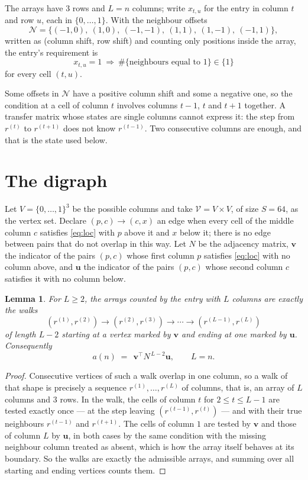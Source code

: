 \documentclass[11pt,a4paper]{article}
\theoremstyle{plain}
\newtheorem{lemma}[theorem]{Lemma}
\theoremstyle{definition}
\begin{document}
The arrays have $3$ rows and $L=n$ columns; write $x_{t,u}$ for the entry in
column $t$ and row $u$, each in $\{0,\dots,1\}$. With the neighbour offsets
\[
\mathcal N=\{(-1,0),\ (1,0),\ (-1,-1),\ (1,1),\ (1,-1),\ (-1,1)\},
\]
written as (column shift, row shift) and counting only positions inside the array, the
entry's requirement is
\begin{equation}\label{eq:loc}
x_{t,u}=1\ \Rightarrow\ \#\{\text{neighbours equal to }1\}\in\{1\}
\end{equation}
for every cell $(t,u)$.

Some offsets in $\mathcal N$ have a positive column shift and some a negative one, so the
condition at a cell of column $t$ involves columns $t-1$, $t$ and $t+1$ together. A transfer
matrix whose states are single columns cannot express it: the step from $r^{(t)}$ to
$r^{(t+1)}$ does not know $r^{(t-1)}$. Two consecutive columns are enough, and that is
the state used below.

\section{The digraph}

Let $V=\{0,\dots,1\}^{3}$ be the possible columns and take
$\mathcal V=V\times V$, of size $S=64$, as the vertex set. Declare $(p,c)\to(c,x)$ an edge
when every cell of the middle column $c$ satisfies \eqref{eq:loc} with $p$ above it and $x$
below it; there is no edge between pairs that do not overlap in this way. Let $N$ be the
adjacency matrix, $\mathbf{v}$ the indicator of the pairs $(p,c)$ whose first column $p$
satisfies \eqref{eq:loc} with no column above, and $\mathbf{u}$ the indicator of
the pairs $(p,c)$ whose second column $c$ satisfies it with no column below.

\begin{lemma}\label{lem:walk}
For $L\ge2$, the arrays counted by the entry with $L$ columns are exactly the walks
\[
(r^{(1)},r^{(2)})\to(r^{(2)},r^{(3)})\to\cdots\to(r^{(L-1)},r^{(L)})
\]
of length $L-2$ starting at a vertex marked by $\mathbf{v}$ and ending at one marked by
$\mathbf{u}$. Consequently
\[
a(n)\;=\;\,\mathbf{v}^{\!\top}N^{\,L-2}\mathbf{u},\qquad L=n .
\]
\end{lemma}

\begin{proof}
Consecutive vertices of such a walk overlap in one column, so a walk of that shape is
precisely a sequence $r^{(1)},\dots,r^{(L)}$ of columns, that is, an array of $L$ columns
and $3$ rows. In the walk, the cells of column $t$ for $2\le t\le L-1$ are tested
exactly once --- at the step leaving $(r^{(t-1)},r^{(t)})$ --- and with their true
neighbours $r^{(t-1)}$ and $r^{(t+1)}$. The cells of column $1$ are tested by
$\mathbf{v}$ and those of column $L$ by $\mathbf{u}$, in both cases by the same condition
with the missing neighbour column treated as absent, which is how the array itself behaves at
its boundary. So the walks are exactly the admissible arrays, and summing over all starting
and ending vertices counts them.
\end{proof}
\end{document}
